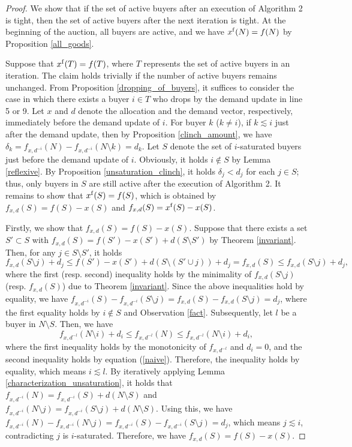 \documentclass[letterpaper,11pt]{article}
\begin{document}
	\begin{proof}
	We show that if the set of active buyers 
	after an execution of Algorithm 2
	is tight, then the set of active buyers after the next iteration is tight.
	At the beginning of the auction, all buyers are active, and 
	we have $x^{\rm f}(N)=f(N)$ by Proposition \ref{all_goods}.
	
	Suppose that $x^{\rm f} (T)=f(T)$, where $T$ represents the set of active buyers in an iteration.
	The claim holds trivially if the number of active buyers remains unchanged.
	From Proposition \ref{dropping_of_buyers}, it suffices to consider the case 
	in which there exists a buyer $i\in T$ who drops by the demand update in line 5 or 9.
	Let $x$ and $d$ denote the allocation and the demand vector, 
	respectively, immediately before the demand update of $i$.
	For buyer $k$ ($k\neq i$), if $k\lesssim i$ just after the demand update, 
	then by Proposition \ref{clinch_amount}, we have 
	$\delta_k=f_{x,d^{-i}}(N)-f_{x,d^{-i}}(N\setminus k)=d_k$.
	Let $S$ denote the set of $i$-saturated buyers just before the demand update of $i$. 
	Obviously, it holds $i\notin S$ by Lemma \ref{reflexive}. 
	By Proposition \ref{unsaturation_clinch}, it holds $\delta_j<d_j$ for each $j\in S$; thus, 
	only buyers in $S$ are still active after the execution of Algorithm 2.
	It remains to show that $x^{\rm f} (S)=f(S)$, 
	which is obtained by 
	$f_{x,d}(S)=f(S)-x(S)$ and $f_{x,d}(S)=x^{\rm f}(S)-x(S)$.


	Firstly, we show that $f_{x,d}(S)=f(S)-x(S)$.
	Suppose that there exists a set $S'\subset S$ with 
	$f_{x,d}(S)=f(S')-x(S')+d(S\setminus S')$ by Theorem \ref{invariant}.
	Then, for any $j\in S\setminus S'$, it holds  
	\[
	f_{x,d}(S\setminus j)+d_j\leq f(S')-x(S')+d(S\setminus (S'\cup j))+d_j= f_{x,d}(S)\leq f_{x,d}(S\setminus j)+d_j,
	\]
	where the first (resp. second) inequality holds by the minimality of $f_{x,d}(S\setminus j)$ 
	(resp. $f_{x,d}(S)$) due to Theorem \ref{invariant}.
	Since the above inequalities hold by equality, we have  
	$f_{x,d^{-i}}(S)-f_{x,d^{-i}}(S\setminus j)=f_{x,d}(S)-f_{x,d}(S\setminus j)=d_j$, 
	where the first equality holds by  $i\notin S$ and Observation \ref{fact}.
	Subsequently, let $l$ be a buyer in $N\setminus S$.
	Then, we have 
	\[
	f_{x,d^{-l}}(N\setminus i)+d_i\leq f_{x,d^{-l}}(N)\leq f_{x,d^{-l}}(N\setminus i)+d_i,
	\]
	where the first inequality holds by the monotonicity of $f_{x,d^{-l}}$ and $d_i=0$, and 
	the second inequality holds by equation (\ref{naive}).
	Therefore, the inequality holds by equality, which means $i\lesssim l$.
	By iteratively applying Lemma \ref{characterization_unsaturation}, 
	it holds that $f_{x,d^{-i}}(N)=f_{x,d^{-i}}(S)+d(N\setminus S)$ and 
	 $f_{x,d^{-i}}(N\setminus j)=f_{x,d^{-i}}(S\setminus j)+d(N\setminus S)$.
	Using this, we have 
	$f_{x,d^{-i}}(N)-f_{x,d^{-i}}(N\setminus j)=f_{x,d^{-i}}(S)-f_{x,d^{-i}}(S\setminus j)=d_j$, 
	which means $j\lesssim i$, contradicting $j$ is $i$-saturated.
	Therefore, we have $f_{x,d}(S)=f(S)-x(S)$. 
	

\end{proof}
\end{document}

